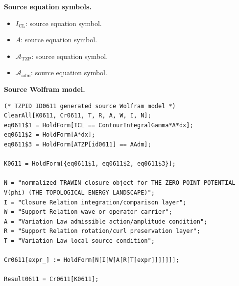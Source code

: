 \begin{minipage}[t]{0.49\linewidth}
\begingroup
\small
\raggedright
\textbf{Source equation symbols.}\par
\begin{itemize}[leftmargin=1.35em,itemsep=1pt,topsep=1pt,parsep=0pt]
    \item $I_{\mathrm{CL}}$: source equation symbol.
    \item $A$: source equation symbol.
    \item $\mathcal{A}_{\mathrm{TZP}}$: source equation symbol.
    \item $\mathcal{A}_{\mathrm{adm}}$: source equation symbol.
\end{itemize}
\endgroup
\end{minipage}\hfill
\begin{minipage}[t]{0.47\linewidth}
\begingroup
\scriptsize
\raggedright
\textbf{Source Wolfram model.}\par
\begin{Verbatim}[fontsize=\tiny,breaklines=true,breakanywhere=true]
(* TZPID ID0611 generated source Wolfram model *)
ClearAll[K0611, Cr0611, T, R, A, W, I, N];
eq0611$1 = HoldForm[ICL == ContourIntegralGamma*A*dx];
eq0611$2 = HoldForm[A*dx];
eq0611$3 = HoldForm[ATZP[id0611] == AAdm];

K0611 = HoldForm[{eq0611$1, eq0611$2, eq0611$3}];

N = "normalized TRAWIN closure object for THE ZERO POINT POTENTIAL V(phi) (THE TOPOLOGICAL ENERGY LANDSCAPE)";
I = "Closure Relation integration/comparison layer";
W = "Support Relation wave or operator carrier";
A = "Variation Law admissible action/amplitude condition";
R = "Support Relation rotation/curl preservation layer";
T = "Variation Law local source condition";

Cr0611[expr_] := HoldForm[N[I[W[A[R[T[expr]]]]]]];

Result0611 = Cr0611[K0611];
\end{Verbatim}
\endgroup
\end{minipage}


